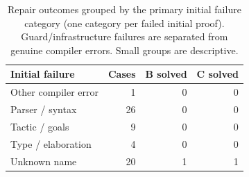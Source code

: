 \begin{table}[t]
\centering
\caption{Repair outcomes grouped by the primary initial failure category (one category per failed initial proof). Guard/infrastructure failures are separated from genuine compiler errors. Small groups are descriptive.}
\label{tab:errors}
\small
\begin{tabular}{lrrr}
\toprule
Initial failure & Cases & B solved & C solved \\
\midrule
Other compiler error & 1 & 0 & 0 \\
Parser / syntax & 26 & 0 & 0 \\
Tactic / goals & 9 & 0 & 0 \\
Type / elaboration & 4 & 0 & 0 \\
Unknown name & 20 & 1 & 1 \\
\bottomrule
\end{tabular}
\end{table}
